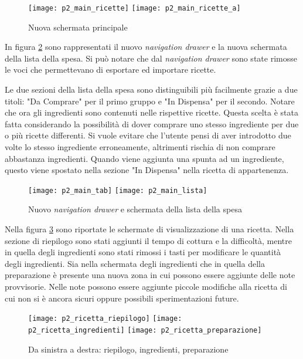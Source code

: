 \begin{figure}[ht]
  \begin{center}
    \texttt{[image: p2\_main\_ricette]}
    \texttt{[image: p2\_main\_ricette\_a]}
    \caption{Nuova schermata principale}
    \label{fig:p2_main_ricette}
  \end{center}
\end{figure}

In figura \ref{fig:p2_main_lista_della_spesa} sono rappresentati il nuovo \textit{navigation drawer} e la nuova schermata della lista della spesa.
Si può notare che dal \textit{navigation drawer} sono state rimosse le voci che permettevano di esportare ed importare ricette.

Le due sezioni della lista della spesa sono distinguibili più facilmente grazie a due titoli: "Da Comprare" per il primo gruppo e "In Dispensa" per il secondo.
Notare che ora gli ingredienti sono contenuti nelle rispettive ricette.
Questa scelta è stata fatta considerando la possibilità di dover comprare uno stesso ingrediente per due o più ricette differenti.
Si vuole evitare che l'utente pensi di aver introdotto due volte lo stesso ingrediente erroneamente, altrimenti rischia di non comprare abbastanza ingredienti.
Quando viene aggiunta una spunta ad un ingrediente, questo viene spostato nella sezione "In Dispensa" nella ricetta di appartenenza.

\begin{figure}[ht]
  \begin{center}
    \texttt{[image: p2\_main\_tab]}
    \texttt{[image: p2\_main\_lista]}
    \caption{Nuovo \textit{navigation drawer} e schermata della lista della spesa}
    \label{fig:p2_main_lista_della_spesa}
  \end{center}
\end{figure}

Nella figura \ref{fig:p2_ricetta} sono riportate le schermate di visualizzazione di una ricetta.
Nella sezione di riepilogo sono stati aggiunti il tempo di cottura e la difficoltà, mentre in quella degli ingredienti sono stati rimossi i tasti per modificare le quantità degli ingredienti.
Sia nella schermata degli ingredienti che in quella della preparazione è presente una nuova zona in cui possono essere aggiunte delle note provvisorie.
Nelle note possono essere aggiunte piccole modifiche alla ricetta di cui non si è ancora sicuri oppure possibili sperimentazioni future.

\begin{figure}[ht]
  \begin{center}
    \texttt{[image: p2\_ricetta\_riepilogo]}
    \texttt{[image: p2\_ricetta\_ingredienti]}
    \texttt{[image: p2\_ricetta\_preparazione]}
    \caption{Da sinistra a destra: riepilogo, ingredienti, preparazione}
    \label{fig:p2_ricetta}
  \end{center}
\end{figure}


